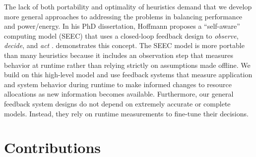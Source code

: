 The lack of both portability and optimality of heuristics demand that we develop more general approaches to addressing the problems in balancing performance and power/energy.
In his PhD dissertation, Hoffmann proposes a ``self-aware'' computing model (SEEC) that uses a closed-loop feedback design to \emph{observe}, \emph{decide}, and \emph{act} \cite{HoffmannPhD}.
 demonstrates this concept.
The SEEC model is more portable than many heuristics because it includes an observation step that measures behavior at runtime rather than relying strictly on assumptions made offline.
We build on this high-level model and use feedback systems that measure application and system behavior during runtime to make informed changes to resource allocations as new information becomes available.
Furthermore, our general feedback system designs do not depend on extremely accurate or complete models.
Instead, they rely on runtime measurements to fine-tune their decisions.


\section{Contributions}

